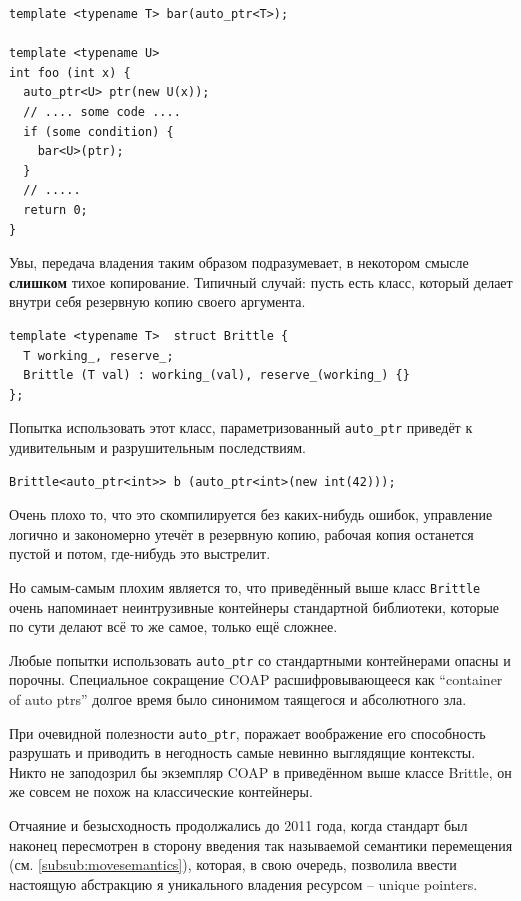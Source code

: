 \documentclass[a4paper,12pt,oneside]{article}
\begin{document}
\begin{lstlisting}
template <typename T> bar(auto_ptr<T>);

template <typename U>
int foo (int x) {
  auto_ptr<U> ptr(new U(x));
  // .... some code ....
  if (some condition) {
    bar<U>(ptr);
  }
  // .....
  return 0;
}
\end{lstlisting}

Увы, передача владения таким образом подразумевает, в некотором смысле \textbf{слишком} тихое копирование. Типичный случай: пусть есть класс, который делает внутри себя резервную копию своего аргумента.

\begin{lstlisting}
template <typename T>  struct Brittle {
  T working_, reserve_;
  Brittle (T val) : working_(val), reserve_(working_) {}
};
\end{lstlisting}

Попытка использовать этот класс, параметризованный \lstinline!auto_ptr! приведёт к удивительным и разрушительным последствиям.

\begin{lstlisting}
Brittle<auto_ptr<int>> b (auto_ptr<int>(new int(42)));
\end{lstlisting}

Очень плохо то, что это скомпилируется без каких-нибудь ошибок, управление логично и закономерно утечёт в резервную копию, рабочая копия останется пустой и потом, где-нибудь это выстрелит.

Но самым-самым плохим является то, что приведённый выше класс \lstinline!Brittle! очень напоминает неинтрузивные контейнеры стандартной библиотеки, которые по сути делают всё то же самое, только ещё сложнее.

Любые попытки использовать \lstinline!auto_ptr! со стандартными контейнерами опасны и порочны. Специальное сокращение COAP расшифровывающееся как ``container of auto ptrs'' долгое время было синонимом таящегося и абсолютного зла.

При очевидной полезности \lstinline!auto_ptr!, поражает воображение его способность разрушать и приводить в негодность самые невинно выглядящие контексты. Никто не заподозрил бы экземпляр COAP в приведённом выше классе Brittle, он же совсем не похож на классические контейнеры.

Отчаяние и безысходность продолжались до 2011 года, когда стандарт был наконец пересмотрен в сторону введения так называемой семантики перемещения (см. \ref{subsub:movesemantics}), которая, в свою очередь, позволила ввести настоящую абстракцию я уникального владения ресурсом -- unique pointers.
\end{document}
